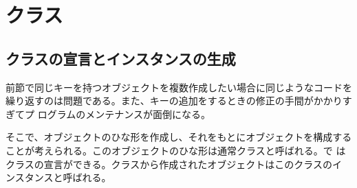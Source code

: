  \section{クラス}
 \subsection{クラスの宣言とインスタンスの生成}
前節で同じキーを持つオブジェクトを複数作成したい場合に同じようなコードを
繰り返すのは問題である。また、キーの追加をするときの修正の手間がかかりすぎてプ
ログラムのメンテナンスが面倒になる。

そこで、オブジェクトのひな形を作成し、それをもとにオブジェクトを構成する
ことが考えられる。このオブジェクトのひな形は通常クラスと呼ばれる。\ES で
はクラスの宣言ができる。クラスから作成されたオブジェクトはこのクラスのイ
ンスタンスと呼ばれる。

